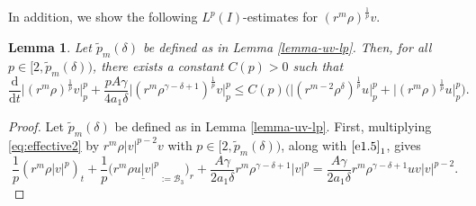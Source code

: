 \documentclass[11pt,reqno]{amsart}
\newtheorem{lem}{Lemma}[section]
\numberwithin{rk}{section}
\numberwithin{prop}{section}
\numberwithin{mydef}{section}
\numberwithin{lem}{section}
\numberwithin{equation}{section}
\numberwithin{thm}{section}
\begin{document}
In addition, we show the following $L^p(I)$-estimates for $(r^m\rho)^{\frac{1}{p}}v$.
\begin{lem}\label{lem-v-lp}
Let $\tilde{p}_m(\delta)$ be defined as in {\rm Lemma \ref{lemma-uv-lp}}. Then, for all $p\in [2,\tilde{p}_m(\delta))$, there exists a constant $C(p)>0$ such that
\begin{equation}\label{dt-v-p}
\frac{\mathrm{d}}{\mathrm{d}t}\big|(r^m\rho)^\frac{1}{p} v\big|_{p}^{p}+\frac{pA\gamma}{4a_1\delta}\big|(r^m\rho^{\gamma-\delta+1})^\frac{1}{p} v\big|_{p}^{p}\leq C(p)\big(\big|(r^{m-2}\rho^\delta)^\frac{1}{p} u\big|_{p}^{p}+\big|(r^m\rho)^\frac{1}{p} u\big|_{p}^{p}\big).
\end{equation}
\end{lem}
\begin{proof}
Let $\tilde{p}_m(\delta)$ be defined as in Lemma \ref{lemma-uv-lp}. First, multiplying \eqref{eq:effective2} by $r^m\rho|v|^{p-2}v$ with $p\in[2,\tilde{p}_m(\delta))$, along with $\eqref{e1.5}_1$, gives
\begin{equation}\label{430}
\frac{1}{p}(r^m\rho |v|^p)_t+ \frac{1}{p}\big(r^m\underline{\rho u|v|^p}_{:=\mathcal{B}_3}\big)_r+\frac{A\gamma}{2a_1\delta} r^m\rho^{\gamma-\delta+1} |v|^p=\frac{A\gamma}{2a_1\delta} r^m\rho^{\gamma-\delta+1} uv|v|^{p-2}.
\end{equation}


\end{proof}
\end{document}
